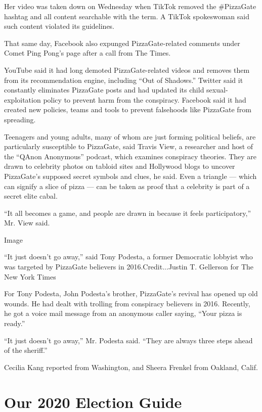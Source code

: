 Her video was taken down on Wednesday when TikTok removed the
\#PizzaGate hashtag and all content searchable with the term. A TikTok
spokeswoman said such content violated its guidelines.

That same day, Facebook also expunged PizzaGate-related comments under
Comet Ping Pong's page after a call from The Times.

YouTube said it had long demoted PizzaGate-related videos and removes
them from its recommendation engine, including ``Out of Shadows.''
Twitter said it constantly eliminates PizzaGate posts and had updated
its child sexual-exploitation policy to prevent harm from the
conspiracy. Facebook said it had created new policies, teams and tools
to prevent falsehoods like PizzaGate from spreading.

Teenagers and young adults, many of whom are just forming political
beliefs, are particularly susceptible to PizzaGate, said Travis View, a
researcher and host of the ``QAnon Anonymous'' podcast, which examines
conspiracy theories. They are drawn to celebrity photos on tabloid sites
and Hollywood blogs to uncover PizzaGate's supposed secret symbols and
clues, he said. Even a triangle --- which can signify a slice of pizza
--- can be taken as proof that a celebrity is part of a secret elite
cabal.

``It all becomes a game, and people are drawn in because it feels
participatory,'' Mr. View said.

Image

``It just doesn't go away,'' said Tony Podesta, a former Democratic
lobbyist who was targeted by PizzaGate believers in 2016.Credit...Justin
T. Gellerson for The New York Times

For Tony Podesta, John Podesta's brother, PizzaGate's revival has opened
up old wounds. He had dealt with trolling from conspiracy believers in
2016. Recently, he got a voice mail message from an anonymous caller
saying, ``Your pizza is ready.''

``It just doesn't go away,'' Mr. Podesta said. ``They are always three
steps ahead of the sheriff.''

Cecilia Kang reported from Washington, and Sheera Frenkel from Oakland,
Calif.

\hypertarget{our-2020-election-guide}{%
\section{Our 2020 Election Guide}\label{our-2020-election-guide}}

